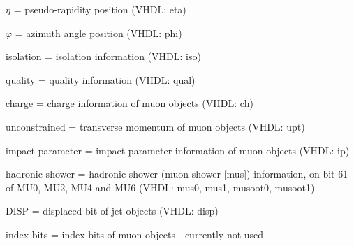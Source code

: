 \begin{description}
\item {$\eta$} = pseudo-rapidity position (VHDL: eta)
\item {$\varphi$} = azimuth angle position (VHDL: phi)
\item {isolation} = isolation information (VHDL: iso)
\item {quality} = quality information (VHDL: qual)
\item {charge} = charge information of muon objects (VHDL: ch)
\item {unconstrained \pt} = transverse momentum of muon objects (VHDL: upt)
\item {impact parameter} = impact parameter information of muon objects (VHDL: ip)
\item {hadronic shower} = hadronic shower (muon shower [mus]) information, on bit 61 of MU0, MU2, MU4 and MU6 (VHDL: mus0, mus1, musoot0, musoot1)
\item {DISP} = displaced bit of jet objects (VHDL: disp)
\item {index bits} = index bits of muon objects - currently not used
\end{description}

\clearpage
